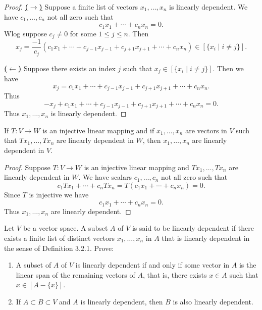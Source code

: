 \begin{proof}
    \underline{\textbf{($\longrightarrow$)}}
    Suppose a finite list of vectors $x_1, \ldots, x_n$ 
    is linearly dependent. We have $c_1, \ldots, c_n$ not all zero such that
    \[c_1 x_1 + \cdots + c_n x_n = 0.\]
    Wlog suppose $c_j \ne 0$ for some $1 \le j \le n$.
    Then
    \[
    x_j = \frac{-1}{c_j}(c_1 x_1 + \cdots + c_{j-1} x_{j-1} + c_{j+1} x_{j+1} + \cdots + c_n x_n)
    \in [\{x_i \mid i \ne j\}].
    \]

    \underline{\textbf{($\longleftarrow$)}}
    Suppose there exists an index $j$ such that 
    $x_j \in [\{x_i \mid i \ne j\}]$.
    Then we have 
    \[x_j = c_1 x_1 + \cdots + c_{j-1} x_{j-1} + c_{j+1} x_{j+1} + \cdots + c_n x_n.\]
    Thus
    \[-x_j + c_1 x_1 + \cdots + c_{j-1} x_{j-1} + c_{j+1} x_{j+1} + \cdots + c_n x_n = 0.\]
    Thus $x_1, \ldots, x_n$ is linearly dependent.
\end{proof}


\begin{tcolorbox}[title=Problem 7, breakable]
    If $T : V \longrightarrow W$ is an injective 
    linear mapping and if $x_1, \ldots, x_n$ are vectors 
    in $V$ such that $Tx_1, \ldots, Tx_n$ are linearly 
    dependent in $W$, then $x_1, \ldots, x_n$ are 
    linearly dependent in $V$.
\end{tcolorbox}

\begin{proof}
    Suppose $T : V \longrightarrow W$ is an injective 
    linear mapping and $Tx_1, \ldots, Tx_n$ are linearly 
    dependent in $W$. We have scalars $c_1, \ldots, c_n$ not all zero such that
    \[c_1 Tx_1 + \cdots + c_n Tx_n = T(c_1 x_1 + \cdots + c_n x_n) = 0.\]
    Since $T$ is injective we have
    \[c_1 x_1 + \cdots + c_n x_n = 0.\]
    Thus $x_1, \ldots, x_n$ are linearly dependent.
\end{proof}

\begin{tcolorbox}[title=Problem 8, breakable]
    Let $V$ be a vector space. A subset $A$ of $V$ 
    is said to be linearly dependent if there exists 
    a finite list of distinct vectors 
    $x_1, \ldots, x_n$ in $A$ that is linearly dependent
    in the sense of Definition 3.2.1. Prove:
    \begin{enumerate}
        \item A subset of $A$ of $V$ is linearly dependent
        if and only if some vector in $A$ is the linear span of 
        the remaining vectors of $A$, that is, there 
        exists $x \in A$ such that $x \in [A - \{x\}]$.
        \item If $A \subset B \subset V$ and $A$ is linearly 
        dependent, then $B$ is also linearly dependent.
    \end{enumerate}
\end{tcolorbox}

